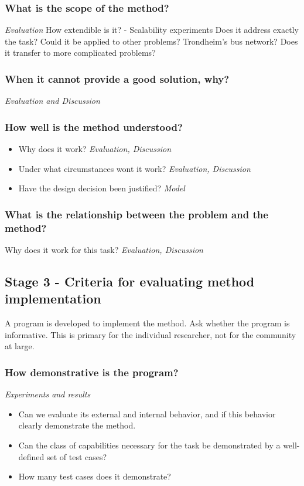 \subsubsection{What is the scope of the method?}
\emph{\color{orange} Evaluation}
How extendible is it? - Scalability experiments
Does it address exactly the task?
Could it be applied to other problems? Trondheim's bus network?
Does it transfer to more complicated problems?

\subsubsection{When it cannot provide a good solution, why?}
\emph{\color{orange} Evaluation and Discussion}

\subsubsection{How well is the method understood?}
\begin{itemize}
\item Why does it work? \emph{\color{orange} Evaluation, Discussion}
\item Under what circumstances wont it work? \emph{\color{orange} Evaluation, Discussion}
\item Have the design decision been justified? \emph{\color{orange} Model}
\end{itemize}

\subsubsection{What is the relationship between the problem and the method?}
Why does it work for this task? \emph{\color{orange} Evaluation, Discussion}

\subsection{Stage 3 - Criteria for evaluating method implementation}
A program is developed to implement the method. Ask whether the program is informative. This is primary for the individual researcher, not for the community at large. 

\subsubsection{How demonstrative is the program?}
\emph{\color{orange} Experiments and results}
\begin{itemize}
\item Can we evaluate its external and internal behavior, and if this behavior clearly demonstrate the method. 
\item Can the class of capabilities necessary for the task be demonstrated by a well-defined set of test cases?
\item How many test cases does it demonstrate?
\end{itemize}
